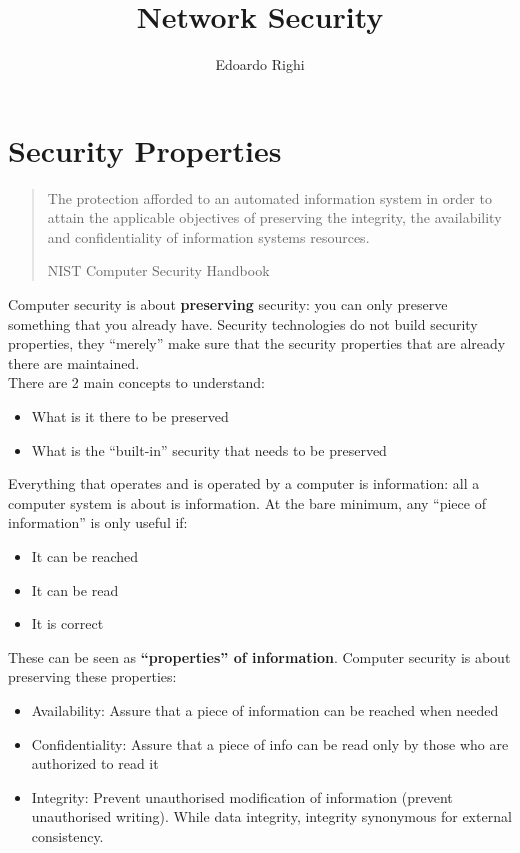 \documentclass[a4paper, 10pt, titlepage]{article}
\begin{document}
\title{Network Security}
\author{Edoardo Righi}
\maketitle
\thispagestyle{empty}
\tableofcontents
\newpage

\section{Security Properties}

\begin{quote}
The protection afforded to an automated information system in order to attain the applicable objectives of preserving the integrity, the availability and confidentiality of information systems resources.
\begin{flushright}
NIST Computer Security Handbook
\end{flushright}
\end{quote}	
Computer security is about \textbf{preserving} security: you can only preserve something that you already have. Security technologies do not build security properties, they “merely” make sure that the security properties that are already there are maintained.\\
There are 2 main concepts to understand:
\begin{itemize}
	\item What is it there to be preserved
	\item What is the “built-in” security that needs to be preserved
\end{itemize}
Everything that operates and is operated by a computer is information: all a computer system is about is information.
At the bare minimum, any “piece of information” is only useful if:
\begin{itemize}
	\item It can be reached
	\item It can be read
	\item It is correct
\end{itemize}
These can be seen as \textbf{“properties” of information}. Computer security is about preserving these properties:
\begin{itemize}
	\item Availability: Assure that a piece of information can be reached when needed
	\item Confidentiality: Assure that a piece of info can be read only by those who are authorized to read it
	\item Integrity: Prevent unauthorised modification of information (prevent unauthorised writing). While data integrity, integrity synonymous for external consistency.
\end{itemize}
\end{document}
